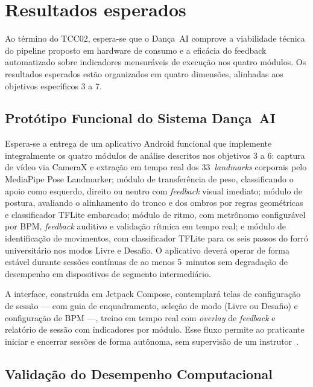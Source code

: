 \newpage
\section{Resultados esperados}
\label{sc:resultados}

Ao término do TCC02, espera-se que o Dança~AI comprove a viabilidade técnica do pipeline proposto em hardware de
consumo e a eficácia do feedback automatizado sobre indicadores mensuráveis de execução nos
quatro módulos. Os resultados esperados estão organizados em quatro
dimensões, alinhadas aos objetivos específicos 3 a 7.

\subsection{Protótipo Funcional do Sistema Dança~AI}
\label{sub:res_prototipo}

Espera-se a entrega de um aplicativo Android funcional que implemente integralmente os
quatro módulos de análise descritos nos objetivos 3 a 6: captura de vídeo via CameraX e
extração em tempo real dos 33~\textit{landmarks} corporais pelo MediaPipe Pose Landmarker;
módulo de transferência de peso, classificando o apoio como esquerdo, direito ou neutro com
\textit{feedback} visual imediato; módulo de postura, avaliando o alinhamento do tronco e dos
ombros por regras geométricas e classificador TFLite embarcado; módulo de ritmo, com
metrônomo configurável por BPM, \textit{feedback} auditivo e validação rítmica em tempo real;
e módulo de identificação de movimentos, com classificador TFLite para os seis passos do
forró universitário nos modos Livre e Desafio. O aplicativo deverá operar de forma estável
durante sessões contínuas de ao menos 5~minutos sem degradação de desempenho em dispositivos
de segmento intermediário.

A interface, construída em Jetpack Compose, contemplará telas de configuração de sessão ---
com guia de enquadramento, seleção de modo (Livre ou Desafio) e configuração de BPM ---,
treino em tempo real com \textit{overlay} de \textit{feedback} e relatório de sessão com
indicadores por módulo. Esse fluxo permite ao praticante iniciar e encerrar sessões de forma
autônoma, sem supervisão de um instrutor~\cite{stanford_ai_dance_coaching}.

\subsection{Validação do Desempenho Computacional}
\label{sub:res_desempenho}

